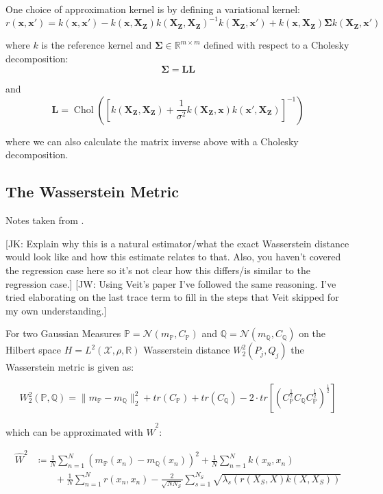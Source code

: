 \documentclass[twoside,11pt]{article}
\newcommand{\jk}[1]{{\color{blue} [JK: #1]}}
\newcommand{\jw}[1]{{\color{gray} [JW: #1]}}
\newcommand{\Chol}{\operatorname{Chol}}
\begin{document}
One choice of approximation kernel is by defining a variational kernel:
\[r(\mathbf{x}, \mathbf{x}') = k(\mathbf{x}, \mathbf{x}') - k(\mathbf{x}, \mathbf{X}_{\mathbf{Z}})k(\mathbf{X}_{\mathbf{Z}}, \mathbf{X}_{\mathbf{Z}})^{-1}k(\mathbf{X}_{\mathbf{Z}}, \mathbf{x}') + k(\mathbf{x}, \mathbf{X}_{\mathbf{Z}})\mathbf{\Sigma}k(\mathbf{X}_{\mathbf{Z}}, \mathbf{x}')\]

where $k$ is the reference kernel and $\mathbf{\Sigma} \in \mathbb{R}^{m \times m}$ defined with respect to a Cholesky decomposition:
\[\mathbf{\Sigma} = \mathbf{L}\mathbf{L}\]

and
\[\mathbf{L} = \Chol\left( \left[k(\mathbf{X}_{\mathbf{Z}}, \mathbf{X}_{\mathbf{Z}}) + \frac{1}{\sigma^2} k(\mathbf{X}_{\mathbf{Z}}, \mathbf{x})k(\mathbf{x}', \mathbf{X}_{\mathbf{Z}})\right]^{-1}\right)\]

where we can also calculate the matrix inverse above with a Cholesky decomposition.

\subsection{The Wasserstein Metric}\label{subsec:wasserstein-metric}

Notes taken from \cite{wild2022generalized}.

%
\jk{Explain why this is a natural estimator/what the exact Wasserstein distance would look like and how this estimate relates to that. Also, you haven't covered the regression case here so it's not clear how this differs/is similar to the regression case.}
\jw{Using Veit's paper I've followed the same reasoning. I've tried elaborating on the last trace term to fill in the steps that Veit skipped for my own understanding.}
%

For two Gaussian Measures $\mathbb{P} = \mathcal{N}(m_{\mathbb{P}}, C_{\mathbb{P}})$ and $\mathbb{Q} = \mathcal{N}(m_{\mathbb{Q}}, C_{\mathbb{Q}})$ on the Hilbert space $H=L^2(\mathcal{X}, \rho, \mathbb{R})$ Wasserstein distance $W_2^2(P_j, Q_j)$ the Wasserstein metric is given as:

\[W_2^2(\mathbb{P}, \mathbb{Q}) = \|m_{\mathbb{P}} - m_{\mathbb{Q}}\|_2^2 + tr(C_{\mathbb{P}}) + tr(C_{\mathbb{Q}}) - 2 \cdot tr \left[ \left( C_{\mathbb{P}}^{\frac{1}{2}}C_{\mathbb{Q}}C_{\mathbb{P}}^{\frac{1}{2}}\right)^{\frac{1}{2}}\right]\]

which can be approximated with $\hat{W}^2$:

\[
\begin{split}
\hat{W}^2 & \coloneqq \frac{1}{N}\sum_{n=1}^N (m_{\mathbb{P}}(x_n)-m_{\mathbb{Q}}(x_n))^2 + \frac{1}{N}\sum_{n=1}^{N}k(x_n, x_n) \\
 &\qquad +\frac{1}{N}\sum_{n=1}^{N}r(x_n, x_n) - \frac{2}{\sqrt {N N_S}}\sum_{s=1}^{N_S}\sqrt {\lambda_s(r(X_S, X)k(X, X_S))} \\
\end{split}
\]
\end{document}
